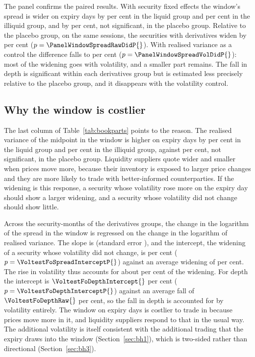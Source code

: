 The panel confirms the paired results. With security fixed effects the window's spread is
wider on expiry days by \PanelWindowSpreadRawLiquid{} per cent in the liquid group and
\PanelWindowSpreadRawIlliquid{} per cent in the illiquid group, and by
\PanelWindowSpreadRawPlacebo{} per cent, not significant, in the placebo group. Relative to the
placebo group, on the same sessions, the securities with derivatives widen by
\PanelWindowSpreadRawDid{} per cent ($p = \PanelWindowSpreadRawDidP{}$). With realised variance
as a control the difference falls to \PanelWindowSpreadVolDid{} per cent
($p = \PanelWindowSpreadVolDidP{}$): most of the widening goes with volatility, and a smaller
part remains. The fall in depth is significant within each derivatives group but is estimated
less precisely relative to the placebo group, and it disappears with the volatility control.

\subsection{Why the window is costlier}

The last column of Table~\ref{tab:bookparts} points to the reason. The realised variance of the
midpoint in the window is higher on expiry days by \BookdayWindowLiquidRv{} per cent in the
liquid group and \BookdayWindowIlliquidRv{} per cent in the illiquid group, against
\BookdayWindowPlaceboRv{} per cent, not significant, in the placebo group. Liquidity suppliers
quote wider and smaller when prices move more, because their inventory is exposed to larger
price changes and they are more likely to trade with better-informed counterparties. If the
widening is this response, a security whose volatility rose more on the expiry day should show
a larger widening, and a security whose volatility did not change should show little.

Across the security-months of the derivatives groups, the change in the logarithm of the
spread in the window is regressed on the change in the logarithm of realised variance. The
slope is \VoltestFoSpreadSlope{} (standard error \VoltestFoSpreadSlopeSe{}), and the intercept,
the widening of a security whose volatility did not change, is \VoltestFoSpreadIntercept{} per
cent ($p = \VoltestFoSpreadInterceptP{}$) against an average widening of
\VoltestFoSpreadRaw{} per cent. The rise in volatility thus accounts for about
\VoltestFoSpreadExplained{} per cent of the widening. For depth the intercept is
$\VoltestFoDepthIntercept{}$ per cent ($p = \VoltestFoDepthInterceptP{}$) against an average
fall of $\VoltestFoDepthRaw{}$ per cent, so the fall in depth is accounted for by volatility
entirely. The window on expiry days is costlier to trade in because prices move more in it, and
liquidity suppliers respond to that in the usual way. The additional volatility is itself
consistent with the additional trading that the expiry draws into the window
(Section~\ref{sec:bh1}), which is two-sided rather than directional (Section~\ref{sec:bh3}).



